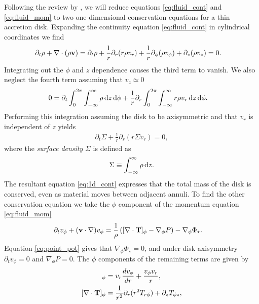 Following the review by \citet{papaloizou1995}, we will reduce equations \ref{eq:fluid_cont} and \ref{eq:fluid_mom} to two one-dimensional conservation equations for a thin accretion disk.
Expanding the continuity equation \ref{eq:fluid_cont} in cylindrical coordinates we find
\begin{align}
    \partial_t \rho + \nabla \cdot (\rho \mathbf{v}) &= \partial_t \rho + \frac{1}{r} \partial_r (r \rho v_r) + \frac{1}{r} \partial_\phi (\rho v_\phi) + \partial_z (\rho v_z) = 0.
\end{align}
Integrating out the $\phi$ and $z$ dependence causes the third term to vanish. We also neglect the fourth term assuming that $v_z \simeq 0$
\begin{align}
    0 &= \partial_t \int_0^{2\pi} \int_{-\infty}^\infty \rho \mathop{}\!\mathrm{d}{z} \mathop{}\!\mathrm{d}{\phi} + \frac{1}{r} \partial_r \int_0^{2\pi} \int_{-\infty}^\infty r \rho v_r \mathop{}\!\mathrm{d}{z} \mathop{}\!\mathrm{d}{\phi}. \label{eq:int_cont}
\end{align}
Performing this integration assuming the disk to be axisymmetric and that $v_r$ is independent of $z$ yields
\begin{align}
    \partial_t \Sigma + \frac{1}{r} \partial_r (r \Sigma v_r) = 0, \label{eq:1d_cont}
\end{align}
where the \textit{surface density} $\Sigma$ is defined as 
\begin{align}
    \Sigma \equiv \int_{-\infty}^\infty \rho \mathop{}\!\mathrm{d}{z}. \label{eq:surf_dens_def}
\end{align} 
The resultant equation \ref{eq:1d_cont} expresses that the total mass of the disk is conserved, even as material moves between adjacent annuli.
To find the other conservation equation we take the $\phi$ component of the momentum equation \ref{eq:fluid_mom}
\begin{align}
    \partial_t v_\phi + (\mathbf{v} \cdot \nabla) v_\phi &= \frac{1}{\rho} \left( [\nabla \cdot \mathbf{T}]_\phi - \nabla_\phi P  \right) - \nabla_\phi \Phi_\star.
\end{align}
Equation \ref{eq:point_pot} gives that $\nabla_\phi \Phi_\star = 0$, and under disk axisymmetry $\partial_t v_\phi = 0$ and $\nabla_\phi P=0$.
The $\phi$ components of the remaining terms are given by \citep[eg.][]{landau1959}
\begin{align}
    [(v \cdot \nabla) \VF{v}]_\phi &= v_r \frac{dv_\phi}{dr} + \frac{v_\phi v_r}{r}, \\
    [\nabla \cdot \VF{T}]_\phi &= \frac{1}{r^2} \partial_r (r^2 T_{r\phi}) + \partial_z T_{\phi z},
\end{align}
